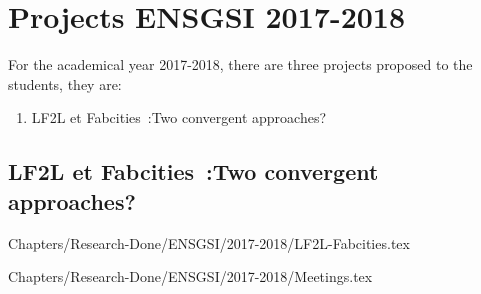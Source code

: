 \chapter{ Projects  ENSGSI 2017-2018}


For the academical year 2017-2018, there are three projects proposed to the students, they are:

\begin{enumerate}
	\item LF2L et Fabcities :Two convergent approaches?  
\end{enumerate}


\section{LF2L et Fabcities :Two convergent approaches? }

{Chapters/Research-Done/ENSGSI/2017-2018/LF2L-Fabcities.tex} 


{Chapters/Research-Done/ENSGSI/2017-2018/Meetings.tex} 